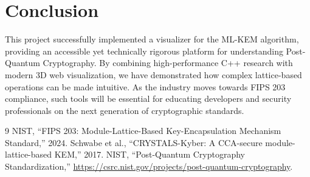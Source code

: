 \documentclass[12pt,a4paper]{article}
\begin{document}
\section{Conclusion}
This project successfully implemented a visualizer for the ML-KEM algorithm, providing an accessible yet technically rigorous platform for understanding Post-Quantum Cryptography. By combining high-performance C++ research with modern 3D web visualization, we have demonstrated how complex lattice-based operations can be made intuitive. As the industry moves towards FIPS 203 compliance, such tools will be essential for educating developers and security professionals on the next generation of cryptographic standards.

\begin{thebibliography}{9}
NIST, ``FIPS 203: Module-Lattice-Based Key-Encapsulation Mechanism Standard,'' 2024.
Schwabe et al., ``CRYSTALS-Kyber: A CCA-secure module-lattice-based KEM,'' 2017.
NIST, ``Post-Quantum Cryptography Standardization,'' \url{https://csrc.nist.gov/projects/post-quantum-cryptography}.
\end{thebibliography}
\end{document}
